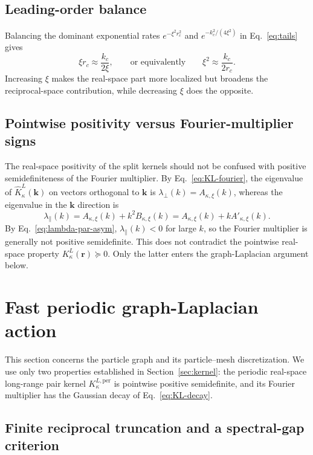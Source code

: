 \documentclass[11pt]{article}
\theoremstyle{plain}
\newcommand{\rr}{\bm r}
\newcommand{\kk}{\bm k}
\DeclareRobustCommand{\_}{\textunderscore\allowbreak}
\begin{document}
\subsection{Leading-order balance}

Balancing the dominant exponential rates
$e^{-\xi^2r_c^2}$ and $e^{-k_c^2/(4\xi^2)}$ in Eq.~\eqref{eq:tails} gives
\begin{equation}
\xi r_c
\approx
\frac{k_c}{2\xi},
\qquad\text{or equivalently}\qquad
\xi^2
\approx
\frac{k_c}{2r_c}.
\end{equation}
Increasing \(\xi\) makes the real-space part more localized but broadens
the reciprocal-space contribution, while decreasing \(\xi\) does the
opposite.

\subsection{Pointwise positivity versus Fourier-multiplier signs}

The real-space positivity of the split kernels should not be confused with
positive semidefiniteness of the Fourier multiplier. By
Eq.~\eqref{eq:KL-fourier}, the eigenvalue of $\widehat K_\kappa^L(\kk)$ on
vectors orthogonal to $\kk$ is $\lambda_\perp(k)=A_{\kappa,\xi}(k)$, whereas
the eigenvalue in the $\kk$ direction is
\begin{equation}
\lambda_\parallel(k)
=
A_{\kappa,\xi}(k)+k^2B_{\kappa,\xi}(k)
=
A_{\kappa,\xi}(k)+kA'_{\kappa,\xi}(k).
\end{equation}
By Eq.~\eqref{eq:lambda-par-asym}, $\lambda_\parallel(k)<0$ for large $k$,
so the Fourier multiplier is generally not positive semidefinite. This
does not contradict the pointwise real-space property
$K_\kappa^L(\rr)\succeq0$. Only the latter enters the graph-Laplacian
argument below.

\section{Fast periodic graph-Laplacian action}
\label{sec:pm}

This section concerns the particle graph and its particle--mesh
discretization. We use only two properties established in
Section~\ref{sec:kernel}: the periodic real-space long-range pair kernel
$K_\kappa^{L,\mathrm{per}}$ is pointwise positive semidefinite, and its
Fourier multiplier has the Gaussian decay of Eq.~\eqref{eq:KL-decay}.

\subsection{Finite reciprocal truncation and a spectral-gap criterion}
\end{document}
